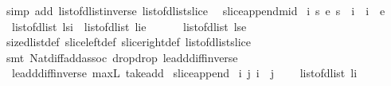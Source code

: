 \begin{isabellebody}
\isamarkupfalse%
\ {\isacharparenleft}simp\ add{\isacharcolon}\ list{\isacharunderscore}of{\isacharunderscore}dlist{\isacharunderscore}inverse\ list{\isacharunderscore}of{\isacharunderscore}dlist{\isacharunderscore}slice\ {\isacharparenright}%
\endisatagproof
{\isafoldproof}%
%
\isadelimproof
\isanewline
%
\endisadelimproof
\isanewline
{}\isamarkupfalse%
\ slice{\isacharunderscore}append{\isacharunderscore}mid{\isacharcolon}\ \isanewline
{\isachardoublequoteopen}{\isasymforall}i\ s\ e{\isachardot}\ s\ {\isasymle}\ i\ {\isasymand}\ i\ {\isasymle}\ e\ {\isasymlongrightarrow}\ \isanewline
\ \ {\isacharparenleft}{\isacharparenleft}list{\isacharunderscore}of{\isacharunderscore}dlist\ {\isacharparenleft}l{\isasymdagger}s{\isachardot}{\isachardot}i{\isacharparenright}{\isacharparenright}\ {\isacharat}\ {\isacharparenleft}list{\isacharunderscore}of{\isacharunderscore}dlist\ {\isacharparenleft}l{\isasymdagger}i{\isachardot}{\isachardot}e{\isacharparenright}{\isacharparenright}{\isacharparenright}\ {\isacharequal}\ \isanewline
\ \ \ \ list{\isacharunderscore}of{\isacharunderscore}dlist\ {\isacharparenleft}l{\isasymdagger}s{\isachardot}{\isachardot}e{\isacharparenright}{\isachardoublequoteclose}\isanewline
%
\isadelimproof
%
\endisadelimproof
%
\isatagproof
{}\isamarkupfalse%
\ size{\isacharunderscore}dlist{\isacharunderscore}def\ slice{\isacharunderscore}left{\isacharunderscore}def\ slice{\isacharunderscore}right{\isacharunderscore}def\ list{\isacharunderscore}of{\isacharunderscore}dlist{\isacharunderscore}slice\ \isanewline
{}\isamarkupfalse%
\ {\isacharparenleft}smt\ Nat{\isachardot}diff{\isacharunderscore}add{\isacharunderscore}assoc{}\ drop{\isacharunderscore}drop\ le{\isacharunderscore}add{\isacharunderscore}diff{\isacharunderscore}inverse\ \isanewline
\ \ le{\isacharunderscore}add{\isacharunderscore}diff{\isacharunderscore}inverse{}\ max{\isacharunderscore}{}L\ take{\isacharunderscore}add{\isacharparenright}%
\endisatagproof
{\isafoldproof}%
%
\isadelimproof
\isanewline
%
\endisadelimproof
\isanewline
{}\isamarkupfalse%
\ slice{\isacharunderscore}append{\isacharunderscore}{}{\isacharcolon}\ \isanewline
{\isachardoublequoteopen}{\isasymforall}i\ j{\isachardot}\ i\ {\isasymle}\ j\ {\isasymlongrightarrow}\ \isanewline
\ \ {\isacharparenleft}{\isacharparenleft}list{\isacharunderscore}of{\isacharunderscore}dlist\ {\isacharparenleft}l{\isasymdagger}{\isachardot}{\isachardot}i{\isacharparenright}{\isacharparenright}\ {\isacharat}\ \isanewline

\end{isabellebody}
